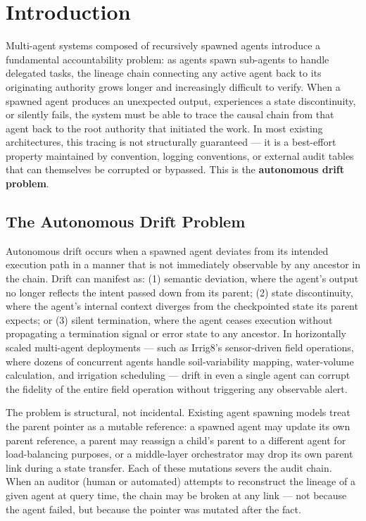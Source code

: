 \section{Introduction}

Multi-agent systems composed of recursively spawned agents introduce a fundamental accountability problem: as agents spawn sub-agents to handle delegated tasks, the lineage chain connecting any active agent back to its originating authority grows longer and increasingly difficult to verify. When a spawned agent produces an unexpected output, experiences a state discontinuity, or silently fails, the system must be able to trace the causal chain from that agent back to the root authority that initiated the work. In most existing architectures, this tracing is not structurally guaranteed — it is a best-effort property maintained by convention, logging conventions, or external audit tables that can themselves be corrupted or bypassed. This is the \textbf{autonomous drift problem}.

\subsection{The Autonomous Drift Problem}

Autonomous drift occurs when a spawned agent deviates from its intended execution path in a manner that is not immediately observable by any ancestor in the chain. Drift can manifest as: (1) semantic deviation, where the agent's output no longer reflects the intent passed down from its parent; (2) state discontinuity, where the agent's internal context diverges from the checkpointed state its parent expects; or (3) silent termination, where the agent ceases execution without propagating a termination signal or error state to any ancestor. In horizontally scaled multi-agent deployments — such as Irrig8's sensor-driven field operations, where dozens of concurrent agents handle soil-variability mapping, water-volume calculation, and irrigation scheduling — drift in even a single agent can corrupt the fidelity of the entire field operation without triggering any observable alert.

The problem is structural, not incidental. Existing agent spawning models treat the parent pointer as a mutable reference: a spawned agent may update its own parent reference, a parent may reassign a child's parent to a different agent for load-balancing purposes, or a middle-layer orchestrator may drop its own parent link during a state transfer. Each of these mutations severs the audit chain. When an auditor (human or automated) attempts to reconstruct the lineage of a given agent at query time, the chain may be broken at any link — not because the agent failed, but because the pointer was mutated after the fact.

